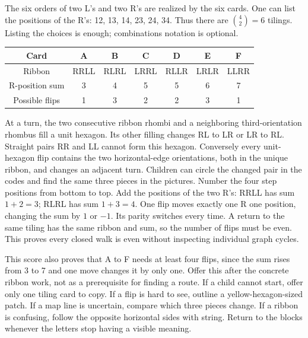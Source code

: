 \documentclass[11pt]{article}
\begin{document}
The six orders of two L's and two R's are realized by the six cards. One can list the positions of the R's: 12, 13, 14, 23, 24, 34. Thus there are \(\binom42=6\) tilings. Listing the choices is enough; combinations notation is optional.
\begin{center}\begin{tabular}{c|cccccc}Card&A&B&C&D&E&F\\\hline Ribbon&RRLL&RLRL&LRRL&RLLR&LRLR&LLRR\\R-position sum&3&4&5&5&6&7\\Possible flips&1&3&2&2&3&1\end{tabular}\end{center}
At a turn, the two consecutive ribbon rhombi and a neighboring third-orientation rhombus fill a unit hexagon. Its other filling changes RL to LR or LR to RL. Straight pairs RR and LL cannot form this hexagon. Conversely every unit-hexagon flip contains the two horizontal-edge orientations, both in the unique ribbon, and changes an adjacent turn. Children can circle the changed pair in the codes and find the same three pieces in the pictures.
Number the four step positions from bottom to top. Add the positions of the two R's: RRLL has sum \(1+2=3\); RLRL has sum \(1+3=4\). One flip moves exactly one R one position, changing the sum by \(1\) or \(-1\). Its parity switches every time. A return to the same tiling has the same ribbon and sum, so the number of flips must be even. This proves every closed walk is even without inspecting individual graph cycles.

This score also proves that A to F needs at least four flips, since the sum rises from 3 to 7 and one move changes it by only one. Offer this after the concrete ribbon work, not as a prerequisite for finding a route.
If a child cannot start, offer only one tiling card to copy. If a flip is hard to see, outline a yellow-hexagon-sized patch. If a map line is uncertain, compare which three pieces change. If a ribbon is confusing, follow the opposite horizontal sides with string. Return to the blocks whenever the letters stop having a visible meaning.
\end{document}
